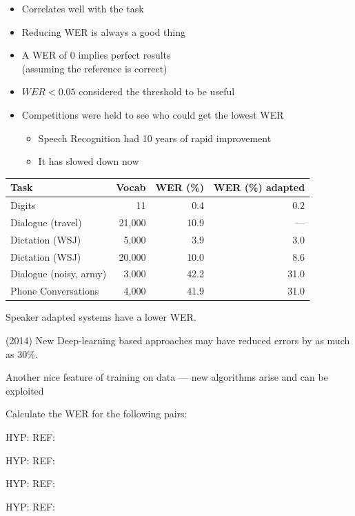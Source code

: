 \documentclass[a4paper,landscape,headrule,footrule,xetex]{foils}
\begin{document}

\begin{itemize}
\item Correlates well with the task
\item Reducing WER is always a good thing
\item A WER of 0 implies perfect results
  \\ (assuming the reference is correct)
\item $WER < 0.05$ considered the threshold to be useful
\item Competitions were held to see who could get the lowest WER
  \begin{itemize}
  \item Speech Recognition had 10 years of rapid improvement
  \item It has slowed down now
  \end{itemize}
\end{itemize}


  \begin{tabular}{lrrr}
    Task & Vocab & WER (\%) & WER  (\%) adapted \\ \hline
    Digits & 11 & 0.4 & 0.2 \\
    Dialogue (travel) & 21,000 & 10.9 & --- \\
    Dictation (WSJ) & 5,000 & 3.9 & 3.0 \\
    Dictation (WSJ) & 20,000 & 10.0 & 8.6 \\
    Dialogue (noisy, army) & 3,000 & 42.2 & 31.0 \\
    Phone Conversations & 4,000 & 41.9 & 31.0 \\
  \end{tabular}

Speaker adapted systems have a lower WER.

(2014) New Deep-learning based approaches may have reduced errors by as much as 30\%.

Another nice feature of training on data --- new algorithms arise and
can be exploited

Calculate the WER for the following pairs:

\begin{exe}
\ex 
  \begin{xlist}
    \ex HYP:  
    \ex REF:  
  \end{xlist}
\medskip
\ex 
  \begin{xlist}
    \ex HYP:  
    \ex REF:  
  \end{xlist}
\medskip
\ex 
  \begin{xlist}
    \ex HYP:  
    \ex REF:  
  \end{xlist}
\medskip
\ex
 \begin{xlist}
    \ex HYP:  
    \ex REF:  
  \end{xlist}
\end{exe}
\end{document}
